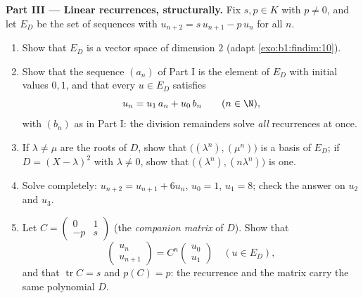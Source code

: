 \begin{problem}
\medskip
\noindent\textbf{Part III --- Linear recurrences, structurally.}
Fix $s, p \in K$ with $p \neq 0$, and let $E_D$ be the set of
sequences with $u_{n+2} = s\,u_{n+1} - p\,u_n$ for all $n$.
\begin{enumerate}[resume]
  \item Show that $E_D$ is a vector space of dimension $2$
        (adapt \cref{exo:b1:findim:10}).
  \item Show that the sequence $(a_n)$ of Part I is the element
        of $E_D$ with initial values $0, 1$, and that every $u
        \in E_D$ satisfies
        \[
        u_n = u_1\,a_n + u_0\,b_n \qquad (n \in \N),
        \]
        with $(b_n)$ as in Part I: the division remainders solve
        \emph{all} recurrences at once.
  \item If $\lambda \neq \mu$ are the roots of $D$, show that
        $\bigl((\lambda^n), (\mu^n)\bigr)$ is a basis of $E_D$;
        if $D = (X-\lambda)^2$ with $\lambda \neq 0$, show that
        $\bigl((\lambda^n), (n\lambda^n)\bigr)$ is one.
  \item Solve completely: $u_{n+2} = u_{n+1} + 6u_n$, $u_0 = 1$,
        $u_1 = 8$; check the answer on $u_2$ and $u_3$.
  \item Let $C = \begin{pmatrix} 0 & 1\\ -p & s\end{pmatrix}$
        (the \emph{companion matrix} of $D$). Show that
        \[
        \begin{pmatrix} u_{n}\\ u_{n+1}\end{pmatrix}
        = C^n \begin{pmatrix} u_0\\ u_1\end{pmatrix}
        \quad (u \in E_D),
        \]
        and that $\operatorname{tr} C = s$ and $p(C) = p$: the
        recurrence and the matrix carry the same polynomial $D$.
\end{enumerate}


\end{problem}
